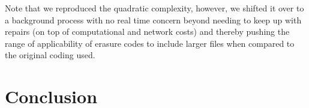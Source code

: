 \documentclass[12pt]{article}
\begin{document}
Note that we reproduced the quadratic complexity, however, we shifted it over to a background process with no real time concern beyond needing to keep up with repairs (on top of computational and network costs) and thereby pushing the range of applicability of erasure codes to include larger files when compared to the original coding used.

\section{Conclusion}


\end{document}
